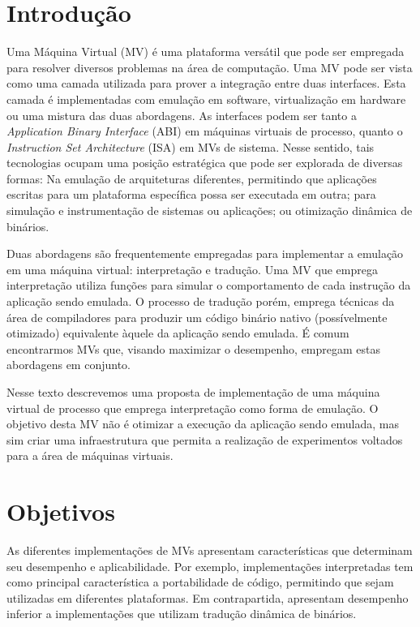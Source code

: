 \documentclass[11pt,twoside]{article}
\begin{document}
\section{Introdução}
Uma Máquina Virtual (MV) é uma plataforma versátil que pode ser empregada para resolver diversos problemas na área de computação. 
Uma MV pode ser vista como uma camada utilizada para prover a integração entre duas interfaces. Esta camada é implementadas com emulação em software, virtualização em hardware ou uma mistura das duas abordagens.
As interfaces podem ser tanto a \emph{Application Binary Interface} (ABI) em máquinas virtuais de processo, quanto o \emph{Instruction Set Architecture} (ISA) em MVs de sistema.
Nesse sentido, tais tecnologias ocupam uma posição estratégica que pode ser explorada de diversas formas:
Na emulação de arquiteturas diferentes, permitindo que aplicações escritas para um plataforma específica possa ser executada em outra; para simulação e instrumentação de sistemas ou aplicações; ou otimização dinâmica de binários.

Duas abordagens são frequentemente empregadas para implementar a emulação em uma máquina virtual: interpretação e tradução.
Uma MV que emprega interpretação utiliza funções para simular o comportamento de cada instrução da aplicação sendo emulada. 
O processo de tradução porém, emprega técnicas da área de compiladores para produzir um código binário nativo (possívelmente otimizado) equivalente àquele da aplicação sendo emulada.
É comum encontrarmos MVs que, visando maximizar o desempenho, empregam estas abordagens em conjunto.

Nesse texto descrevemos uma proposta de implementação de uma máquina virtual de processo que emprega interpretação como forma de emulação. 
O objetivo desta MV não é otimizar a execução da aplicação sendo emulada, mas sim criar uma infraestrutura que permita a realização de experimentos voltados para a área de máquinas virtuais.
   
\section{Objetivos} \label{sec:objetivos}
As diferentes implementações de MVs apresentam características que determinam seu desempenho e aplicabilidade.
Por exemplo, implementações interpretadas tem como principal característica a portabilidade de código, permitindo que sejam utilizadas em diferentes plataformas. 
Em contrapartida, apresentam desempenho inferior a implementações que utilizam tradução dinâmica de binários.
\end{document}
